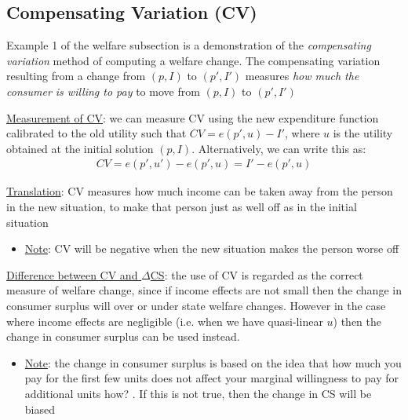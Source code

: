 \documentclass{article}
\begin{document}
\subsection{Compensating Variation (CV)}
Example 1 of the welfare subsection is a demonstration of the \textit{compensating variation} method of computing a welfare change. The compensating variation resulting from a change from $(p, I)$ to $(p', I')$ measures \textit{how much the consumer is willing to pay} to move from $(p, I)$ to $(p', I')$ \par \vspace{0.3em}
  \underline{Measurement of CV}: we can measure CV using the new expenditure function calibrated to the old utility such that $CV = e(p', u) - I'$, where $u$ is the utility obtained at the initial solution $(p, I)$. Alternatively, we can write this as:
  \begin{gather*}
    CV = e(p',u') - e(p',u) = I' - e(p',u)
  \end{gather*}
  \par
  \underline{Translation}: CV measures how much income can be taken away from the person in the new situation, to make that person just as well off as in the initial situation
  \begin{itemize}
    \item  \underline{Note}: CV will be negative when the new situation makes the person worse off
  \end{itemize}
  \par
  \underline{Difference between CV and $\Delta$CS}: the use of CV is regarded as the correct measure of welfare change, since if income effects are not small then the change in consumer surplus will over or under state welfare changes. However in the case where income effects are negligible (i.e. when we have quasi-linear $u$) then the change in consumer surplus can be used instead.
  \begin{itemize}
    \item  \underline{Note}: the change in consumer surplus is based on the idea that how much you pay for the first few units does not affect your marginal willingness to pay for additional units \begingroup\color{magenta} how? \endgroup. If this is not true, then the change in CS will be biased
  \end{itemize}
  \par
\vspace{6mm}
\end{document}
